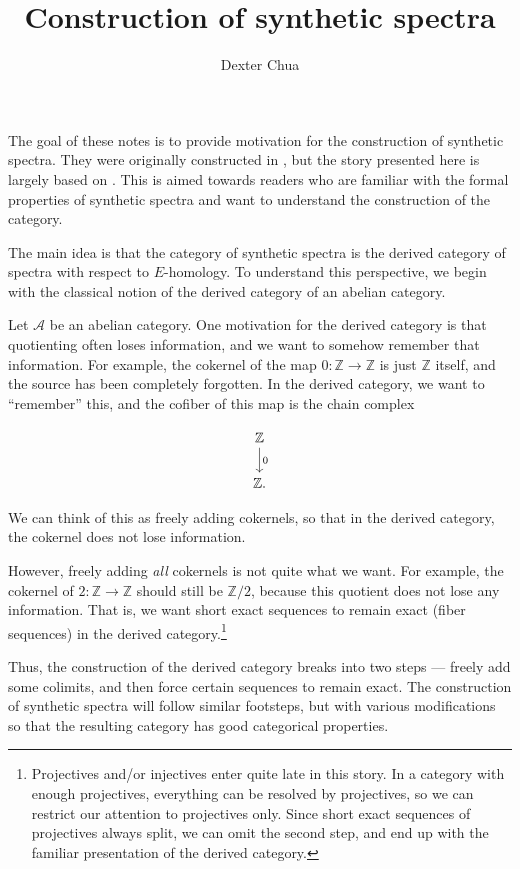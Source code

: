 \documentclass{shortart}
\title{Construction of synthetic spectra}
\author{Dexter Chua}
\theoremstyle{definition}
\newcommand\Z{{\mathbb{Z}}}
\begin{document}
The goal of these notes is to provide motivation for the construction of synthetic spectra. They were originally constructed in \cite{synthetic}, but the story presented here is largely based on \cite{algebraicity}. This is aimed towards readers who are familiar with the formal properties of synthetic spectra and want to understand the construction of the category.

The main idea is that the category of synthetic spectra is the derived category of spectra with respect to $E$-homology. To understand this perspective, we begin with the classical notion of the derived category of an abelian category.

Let $\mathcal{A}$ be an abelian category. One motivation for the derived category is that quotienting often loses information, and we want to somehow remember that information. For example, the cokernel of the map $0\colon \Z \to \Z$ is just $\Z$ itself, and the source has been completely forgotten. In the derived category, we want to ``remember'' this, and the cofiber of this map is the chain complex
\begin{useimager}
  \[
    \begin{tikzcd}
      \Z \ar[d, "0"] \\
      \Z.
    \end{tikzcd}
  \]
\end{useimager}
We can think of this as freely adding cokernels, so that in the derived category, the cokernel does not lose information.

However, freely adding \emph{all} cokernels is not quite what we want. For example, the cokernel of $2 \colon \Z \to \Z$ should still be $\Z/2$, because this quotient does not lose any information. That is, we want short exact sequences to remain exact (fiber sequences) in the derived category.\footnote{Projectives and/or injectives enter quite late in this story. In a category with enough projectives, everything can be resolved by projectives, so we can restrict our attention to projectives only. Since short exact sequences of projectives always split, we can omit the second step, and end up with the familiar presentation of the derived category.}

Thus, the construction of the derived category breaks into two steps --- freely add some colimits, and then force certain sequences to remain exact. The construction of synthetic spectra will follow similar footsteps, but with various modifications so that the resulting category has good categorical properties.
\end{document}
